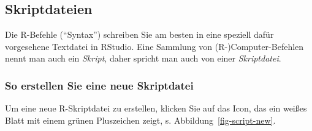 \documentclass[
  a4paper,
]{scrbook}
\theoremstyle{definition}
\theoremstyle{definition}
\theoremstyle{definition}
\theoremstyle{remark}
\begin{document}
\begin{figure}
{\begin{figure}[H]
\begin{minipage}{0.20\linewidth}
{}


\end{minipage}%

\end{figure}%

}

\caption{\label{fig-projects}}

\end{figure}%

\subsection{Skriptdateien}\label{skriptdateien}

Die R-Befehle (``Syntax'') schreiben Sie am besten in eine speziell
dafür vorgesehene Textdatei in RStudio. Eine Sammlung von
(R-)Computer-Befehlen nennt man auch ein \emph{Skript}, daher spricht
man auch von einer \emph{Skriptdatei}.

\subsubsection{So erstellen Sie eine neue
Skriptdatei}\label{so-erstellen-sie-eine-neue-skriptdatei}

Um eine neue R-Skriptdatei zu erstellen, klicken Sie auf das Icon, das
ein weißes Blatt mit einem grünen Pluszeichen zeigt, s.
Abbildung~\ref{fig-script-new}.
\end{document}
